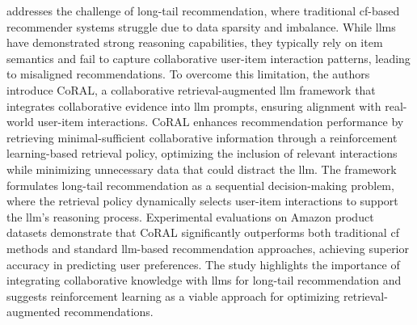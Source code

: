 \textcite{Wu2024} addresses the challenge of long-tail recommendation, where traditional \gls{cf}-based recommender systems struggle due to data sparsity and imbalance.
While \glspl{llm} have demonstrated strong reasoning capabilities, they typically rely on item semantics and fail to capture collaborative user-item interaction patterns, leading to misaligned recommendations.
To overcome this limitation, the authors introduce CoRAL, a collaborative retrieval-augmented \gls{llm} framework that integrates collaborative evidence into \gls{llm} prompts, ensuring alignment with real-world user-item interactions.
CoRAL enhances recommendation performance by retrieving minimal-sufficient collaborative information through a reinforcement learning-based retrieval policy, optimizing the inclusion of relevant interactions while minimizing unnecessary data that could distract the \gls{llm}.
The framework formulates long-tail recommendation as a sequential decision-making problem, where the retrieval policy dynamically selects user-item interactions to support the \gls{llm}'s reasoning process.
Experimental evaluations on Amazon product datasets demonstrate that CoRAL significantly outperforms both traditional \gls{cf} methods and standard \gls{llm}-based recommendation approaches, achieving superior accuracy in predicting user preferences.
The study highlights the importance of integrating collaborative knowledge with \glspl{llm} for long-tail recommendation and suggests reinforcement learning as a viable approach for optimizing retrieval-augmented recommendations.
